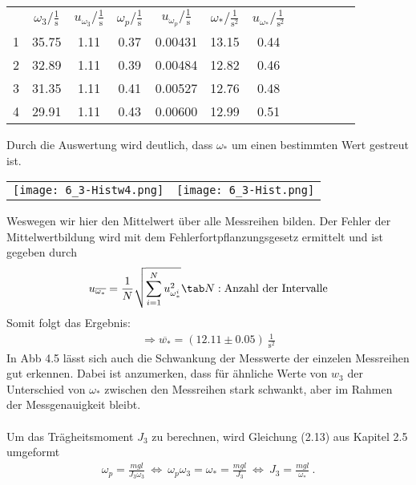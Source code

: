 \begin{center}
    \begin{tabular}{gccccccccccc}
         &      $\omega_3/\frac{1}{\text{s}}$ &  $u_{\omega_3}/\frac{1}{\text{s}}$ &    $\omega_p/\frac{1}{\text{s}}$ &     $u_{\omega_p}/\frac{1}{\text{s}}$ &     $\omega_*/\frac{1}{\text{s}^2}$&  $u_{\omega_*}/\frac{1}{\text{s}^2}$\\
        1 &  35.75 &  1.11 &  0.37 &  0.00431 &  13.15 &  0.44 \\
        2 &  32.89 &  1.11 &  0.39 &  0.00484 &  12.82 &  0.46 \\
        3 &  31.35 &  1.11 &  0.41 &  0.00527 &  12.76 &  0.48 \\
        4 &  29.91 &  1.11 &  0.43 &  0.00600 &  12.99 &  0.51 \\
    \end{tabular}
\end{center}
Durch die Auswertung wird deutlich, dass $\omega_*$ um einen bestimmten Wert gestreut ist. 
\begin{center}
    \begin{tabular}{c c}
        \texttt{[image: 6\_3-Histw4.png]} & \texttt{[image: 6\_3-Hist.png]}
    \end{tabular}
\end{center}
Weswegen wir hier den Mittelwert über alle Messreihen bilden. Der Fehler der Mittelwertbildung wird mit dem Fehlerfortpflanzungsgesetz ermittelt und ist gegeben durch
\begin{align}
    u_{\overline{\omega_*}}=\frac{1}{N}\sqrt{\sum_{i=1}^{N} u_{\omega_*^i}^2}\tab N:\text{Anzahl der Intervalle}
\end{align}
Somit folgt das Ergebnis:
\begin{align*}
    \Rightarrow\boxed{\overline{w_*}=(12.11 \pm 0.05)~\frac{1}{\text{s}^2}}
\end{align*}
In Abb 4.5 lässt sich auch die Schwankung der Messwerte der einzelen Messreihen gut erkennen. Dabei ist anzumerken, dass für ähnliche Werte von $w_3$ der Unterschied von $\omega_*$ zwischen den Messreihen stark schwankt, aber im Rahmen der Messgenauigkeit bleibt.\\ \\
Um das Trägheitsmoment $J_3$ zu berechnen, wird Gleichung (2.13) aus Kapitel 2.5 umgeformt
\begin{align}
    \omega_p = \frac{mgl}{J_3\omega_3}~\Leftrightarrow~\omega_p\omega_3 = \omega_* = \frac{mgl}{J_3}~\Leftrightarrow~J_3 = \frac{mgl}{\omega_*}~.
\end{align}

